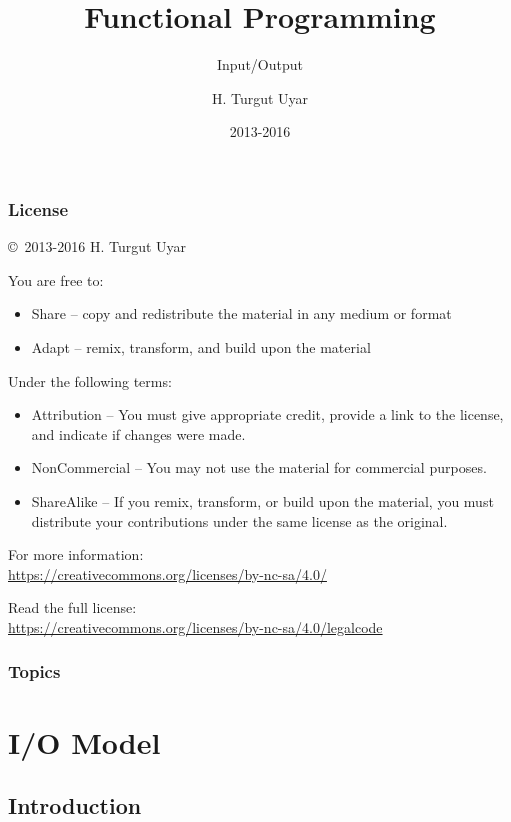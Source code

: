 \documentclass[dvipsnames]{beamer}
\title{Functional Programming}
\subtitle{Input/Output}
\author{H. Turgut Uyar}
\date{2013-2016}
\theoremstyle{plain}
\begin{document}
\begin{frame}
  \titlepage
\end{frame}

\begin{frame}
  \frametitle{License}

  \hfill
  \copyright~2013-2016 H. Turgut Uyar

  \vfill
  \begin{footnotesize}
    You are free to:
    \begin{itemize}
      \itemsep0em
      \item Share -- copy and redistribute the material in any medium or format
      \item Adapt -- remix, transform, and build upon the material
    \end{itemize}

    Under the following terms:
    \begin{itemize}
      \itemsep0em
      \item Attribution -- You must give appropriate credit, provide a link to
        the license, and indicate if changes were made.

      \item NonCommercial -- You may not use the material for commercial
        purposes.

      \item ShareAlike -- If you remix, transform, or build upon the material,
        you must distribute your contributions under the same license as the
        original.
    \end{itemize}

    For more information:\\
    \url{https://creativecommons.org/licenses/by-nc-sa/4.0/}

    \smallskip
    Read the full license:\\
    \url{https://creativecommons.org/licenses/by-nc-sa/4.0/legalcode}
  \end{footnotesize}
\end{frame}

\begin{frame}
  \frametitle{Topics}
  \tableofcontents
\end{frame}

\section{I/O Model}

\subsection{Introduction}
\end{document}
